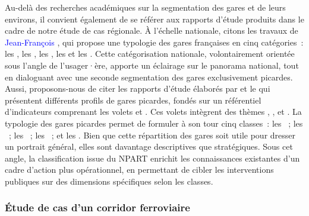 \begin{refsegment}
Au-delà des recherches académiques sur la segmentation des gares et de leurs environs, il convient également de se référer aux rapports d’étude produits dans le cadre de notre étude de cas régionale. À l’échelle nationale, citons les travaux de \textcolor{blue}{Jean-François} \textcolor{blue}{\textcite[98-104]{troin_essai_2024}}, qui propose une typologie des gares françaises en cinq catégories~: les , les , les , les  et les . Cette catégorisation nationale, volontairement orientée sous l’angle de l’usager·ère, apporte un éclairage sur le panorama national, tout en dialoguant avec une seconde segmentation des gares exclusivement picardes. Aussi, proposons-nous de citer les rapports d’étude élaborés par \textcolor{blue}{\textcite[50-57]{hasiak_pour_2011}} et le \textcolor{blue}{\textcite[6]{cete_nord_picardie_profils_2011}} qui présentent différents profils de gares picardes, fondés sur un référentiel d’indicateurs comprenant les volets  et . Ces volets intègrent des thèmes , ,  et . La typologie des gares picardes permet de formuler à son tour cinq classes~: les ~; les ~; les ~; les ~; et les . Bien que cette répartition des gares soit utile pour dresser un portrait général, elles sont davantage descriptives que stratégiques. Sous cet angle, la classification issue du \acrshort{NPART} enrichit les connaissances existantes d’un cadre d'action plus opérationnel, en permettant de cibler les interventions publiques sur des dimensions spécifiques selon les classes.%

\subsubsection*{Étude de cas d'un corridor ferroviaire
    \label{chap6:results-etudes-de-cas}
    }


\end{refsegment}
